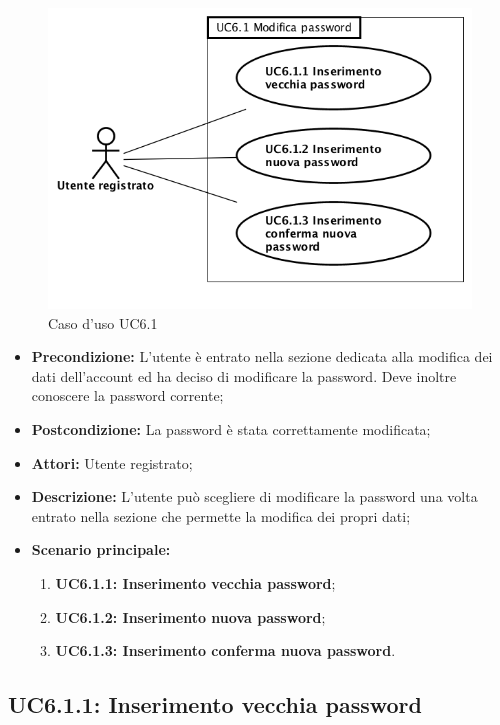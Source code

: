 \begin{figure}[h]
	\begin{center}
	\includegraphics[scale=0.4]{diagram/UC6-1.png}
	\caption{Caso d'uso UC6.1}
	\end{center}
\end{figure}
\begin{itemize}
	\item \textbf{Precondizione:} L’utente è entrato nella sezione dedicata alla modifica dei dati dell’account ed ha deciso di modificare la password. Deve inoltre conoscere la password corrente;
	\item \textbf{Postcondizione:} La password è stata correttamente modificata;
	\item \textbf{Attori:} Utente registrato;
	\item \textbf{Descrizione:} L’utente può scegliere di modificare la password una volta entrato nella sezione che permette la modifica dei propri dati;
	\item \textbf{Scenario principale:}
	\begin{enumerate}
		\item \textbf{ UC6.1.1: Inserimento vecchia password};
		\item \textbf{ UC6.1.2: Inserimento nuova password};
		\item \textbf{ UC6.1.3: Inserimento conferma nuova password}.
	\end{enumerate}
\end{itemize}
\subsection{ UC6.1.1: Inserimento vecchia password}


